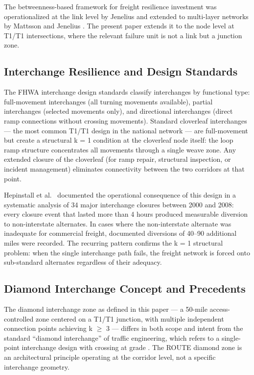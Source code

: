 The betweenness-based framework for freight resilience investment was operationalized at the link level by Jenelius \citep{Jenelius2010} and extended to multi-layer networks by Mattsson and Jenelius \citep{Mattsson2015}. The present paper extends it to the node level at T1/T1 intersections, where the relevant failure unit is not a link but a junction zone.

\subsection{Interchange Resilience and Design Standards}

The FHWA interchange design standards \citep{FHWA_interchange2019} classify interchanges by functional type: full-movement interchanges (all turning movements available), partial interchanges (selected movements only), and directional interchanges (direct ramp connections without crossing movements). Standard cloverleaf interchanges --- the most common T1/T1 design in the national network --- are full-movement but create a structural k = 1 condition at the cloverleaf node itself: the loop ramp structure concentrates all movements through a single weave zone. Any extended closure of the cloverleaf (for ramp repair, structural inspection, or incident management) eliminates connectivity between the two corridors at that point.

Hepinstall et al.\ \citep{Hepinstall2010} documented the operational consequence of this design in a systematic analysis of 34 major interchange closures between 2000 and 2008: every closure event that lasted more than 4 hours produced measurable diversion to non-interstate alternates. In cases where the non-interstate alternate was inadequate for commercial freight, documented diversions of 40--90 additional miles were recorded. The recurring pattern confirms the k = 1 structural problem: when the single interchange path fails, the freight network is forced onto sub-standard alternates regardless of their adequacy.

\subsection{Diamond Interchange Concept and Precedents}

The diamond interchange zone as defined in this paper --- a 50-mile access-controlled zone centered on a T1/T1 junction, with multiple independent connection points achieving k $\geq$ 3 --- differs in both scope and intent from the standard ``diamond interchange'' of traffic engineering, which refers to a single-point interchange design with crossing at grade \citep{FHWA_interchange2019}. The ROUTE diamond zone is an architectural principle operating at the corridor level, not a specific interchange geometry.

